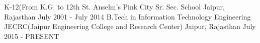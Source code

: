 \begin{cventries}
\cventry
    {K-12(From K.G. to 12th}
    {St. Anselm's Pink City Sr. Sec. School }
    {Jaipur, Rajasthan}
    {July 2001 - July 2014}
    {
    }
  \cventry
    {B.Tech in Information Technology Engineering}
    {JECRC(Jaipur Engineering College and Research Center)}
    {Jaipur, Rajasthan}
    {July 2015 - PRESENT}
    {
    }
\end{cventries}